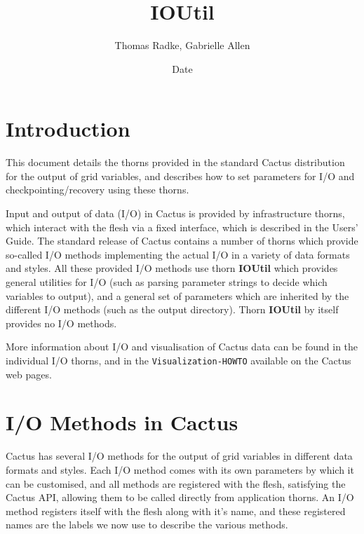 \documentclass{article}
\begin{document}
\title{IOUtil}
\author{Thomas Radke, Gabrielle Allen}
\date{$ $Date$ $}

\maketitle


\section{Introduction}

This document details the thorns provided in the standard Cactus distribution
for the output of grid variables, and describes how to set parameters for I/O
and checkpointing/recovery using these thorns.

Input and output of data (I/O) in Cactus is provided by infrastructure thorns,
which interact with the flesh via a fixed interface, which is described in the
Users' Guide. The standard release of Cactus contains a number of thorns which
provide so-called I/O methods implementing the actual I/O in a variety of data
formats and styles. All these provided I/O methods use thorn {\bf IOUtil} which
provides general utilities for I/O (such as parsing
parameter strings to decide which variables to output), and a general set of
parameters which are inherited by the different I/O methods (such as the output
directory). Thorn {\bf IOUtil} by itself provides no I/O methods.

More information about I/O and visualisation of Cactus data can be found in the
individual I/O thorns, and in the {\tt Visualization-HOWTO} available on the
Cactus web pages.

\section{I/O Methods in Cactus}

Cactus has several I/O methods for the output of grid variables in different
data formats and styles. Each I/O method comes with its own parameters by which
it can be customised, and all methods are registered with the flesh, satisfying
the Cactus API, allowing them to be called directly from application thorns.
An I/O method registers itself with the flesh along with it's name, and these
registered names are the labels we now use to describe the various methods.
\end{document}
